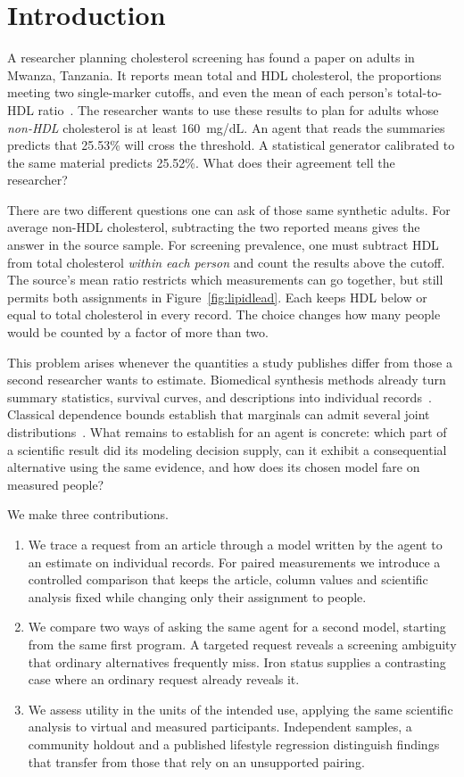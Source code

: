 \documentclass[sigconf,anonymous,review]{acmart}
\begin{document}
\section{Introduction}
A researcher planning cholesterol screening has found a paper on adults in Mwanza, Tanzania. It reports mean total and HDL cholesterol, the proportions meeting two single-marker cutoffs, and even the mean of each person's total-to-HDL ratio~\cite{kavishe}. The researcher wants to use these results to plan for adults whose \emph{non-HDL} cholesterol is at least 160~mg/dL. An agent that reads the summaries predicts that 25.53\% will cross the threshold. A statistical generator calibrated to the same material predicts 25.52\%. What does their agreement tell the researcher?

There are two different questions one can ask of those same synthetic adults. For average non-HDL cholesterol, subtracting the two reported means gives the answer in the source sample. For screening prevalence, one must subtract HDL from total cholesterol \emph{within each person} and count the results above the cutoff. The source's mean ratio restricts which measurements can go together, but still permits both assignments in Figure~\ref{fig:lipidlead}. Each keeps HDL below or equal to total cholesterol in every record. The choice changes how many people would be counted by a factor of more than two.

This problem arises whenever the quantities a study publishes differ from those a second researcher wants to estimate. Biomedical synthesis methods already turn summary statistics, survival curves, and descriptions into individual records~\cite{llmsynthor,kmgen,synthipd,gottal2026text2tabular}. Classical dependence bounds establish that marginals can admit several joint distributions~\cite{makarov,zaev}. What remains to establish for an agent is concrete: which part of a scientific result did its modeling decision supply, can it exhibit a consequential alternative using the same evidence, and how does its chosen model fare on measured people?

We make three contributions.
\begin{enumerate}
\item We trace a request from an article through a model written by the agent to an estimate on individual records. For paired measurements we introduce a controlled comparison that keeps the article, column values and scientific analysis fixed while changing only their assignment to people.
\item We compare two ways of asking the same agent for a second model, starting from the same first program. A targeted request reveals a screening ambiguity that ordinary alternatives frequently miss. Iron status supplies a contrasting case where an ordinary request already reveals it.
\item We assess utility in the units of the intended use, applying the same scientific analysis to virtual and measured participants. Independent samples, a community holdout and a published lifestyle regression distinguish findings that transfer from those that rely on an unsupported pairing.
\end{enumerate}
\end{document}

